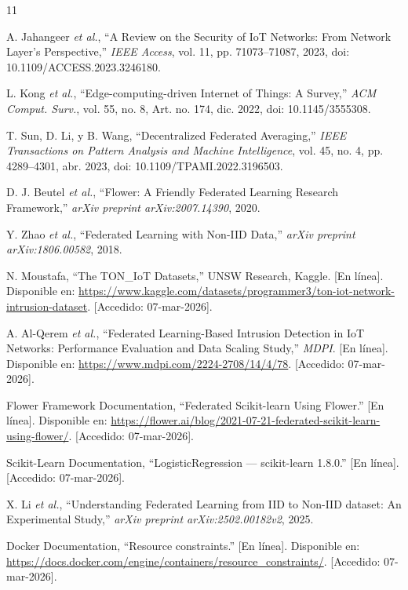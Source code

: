\documentclass[12pt,a4paper]{article}
\begin{document}
\begin{thebibliography}{11}

A. Jahangeer \textit{et al.}, ``A Review on the Security of IoT Networks: From Network Layer's Perspective,'' \textit{IEEE Access}, vol. 11, pp. 71073--71087, 2023, doi: 10.1109/ACCESS.2023.3246180.

L. Kong \textit{et al.}, ``Edge-computing-driven Internet of Things: A Survey,'' \textit{ACM Comput. Surv.}, vol. 55, no. 8, Art. no. 174, dic. 2022, doi: 10.1145/3555308.

T. Sun, D. Li, y B. Wang, ``Decentralized Federated Averaging,'' \textit{IEEE Transactions on Pattern Analysis and Machine Intelligence}, vol. 45, no. 4, pp. 4289--4301, abr. 2023, doi: 10.1109/TPAMI.2022.3196503.

D. J. Beutel \textit{et al.}, ``Flower: A Friendly Federated Learning Research Framework,'' \textit{arXiv preprint arXiv:2007.14390}, 2020.

Y. Zhao \textit{et al.}, ``Federated Learning with Non-IID Data,'' \textit{arXiv preprint arXiv:1806.00582}, 2018.

N. Moustafa, ``The TON\_IoT Datasets,'' UNSW Research, Kaggle. [En línea]. Disponible en: \url{https://www.kaggle.com/datasets/programmer3/ton-iot-network-intrusion-dataset}. [Accedido: 07-mar-2026].

A. Al-Qerem \textit{et al.}, ``Federated Learning-Based Intrusion Detection in IoT Networks: Performance Evaluation and Data Scaling Study,'' \textit{MDPI}. [En línea]. Disponible en: \url{https://www.mdpi.com/2224-2708/14/4/78}. [Accedido: 07-mar-2026].

Flower Framework Documentation, ``Federated Scikit-learn Using Flower.'' [En línea]. Disponible en: \url{https://flower.ai/blog/2021-07-21-federated-scikit-learn-using-flower/}. [Accedido: 07-mar-2026].

Scikit-Learn Documentation, ``LogisticRegression --- scikit-learn 1.8.0.'' [En línea]. [Accedido: 07-mar-2026].

X. Li \textit{et al.}, ``Understanding Federated Learning from IID to Non-IID dataset: An Experimental Study,'' \textit{arXiv preprint arXiv:2502.00182v2}, 2025.

Docker Documentation, ``Resource constraints.'' [En línea]. Disponible en: \url{https://docs.docker.com/engine/containers/resource_constraints/}. [Accedido: 07-mar-2026].

\end{thebibliography}
\end{document}
